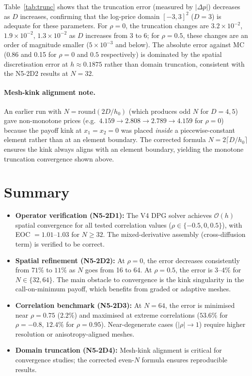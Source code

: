 \documentclass[11pt,a4paper]{article}
\begin{document}
Table~\ref{tab:trunc} shows that the truncation error (measured by $|\Delta p|$)
decreases as $D$ increases, confirming that the log-price domain $[-3,3]^2$
($D=3$) is adequate for these parameters.  For $\rho=0$, the truncation
changes are $3.2\times10^{-2}$, $1.9\times10^{-2}$, $1.3\times10^{-2}$
as $D$ increases from 3 to 6; for $\rho=0.5$, these changes are an order
of magnitude smaller ($5\times10^{-3}$ and below).  The absolute error
against MC (0.86 and 0.15 for $\rho=0$ and $0.5$ respectively) is dominated
by the spatial discretisation error at $h\approx0.1875$ rather than domain
truncation, consistent with the N5-2D2 results at $N=32$.

\paragraph{Mesh-kink alignment note.}
An earlier run with $N=\mathrm{round}(2D/h_0)$ (which produces odd $N$ for
$D=4,5$) gave non-monotone prices (e.g.\ $4.159\to2.808\to2.789\to4.159$ for
$\rho=0$) because the payoff kink at $x_1=x_2=0$ was placed \emph{inside} a
piecewise-constant element rather than at an element boundary.  The corrected
formula $N=2\lceil D/h_0\rceil$ ensures the kink always aligns with an element
boundary, yielding the monotone truncation convergence shown above.

\section{Summary}
\label{sec:summary}

\begin{itemize}
  \item \textbf{Operator verification (N5-2D1):} The V4 DPG solver achieves
    $\mathcal{O}(h)$ spatial convergence for all tested correlation values
    ($\rho\in\{-0.5,0,0.5\}$), with EOC $=1.01$--$1.03$ for $N\geq 32$.
    The mixed-derivative assembly (cross-diffusion term) is verified to be
    correct.

  \item \textbf{Spatial refinement (N5-2D2):} At $\rho=0$, the error
    decreases consistently from $71\%$ to $11\%$ as $N$ goes from 16 to 64.
    At $\rho=0.5$, the error is $3$--$4\%$ for $N\in\{32,64\}$.  The main
    obstacle to convergence is the kink singularity in the call-on-minimum
    payoff, which benefits from graded or adaptive meshes.

  \item \textbf{Correlation benchmark (N5-2D3):} At $N=64$, the error is
    minimised near $\rho=0.75$ ($2.2\%$) and maximised at extreme correlations
    ($53.6\%$ for $\rho=-0.8$, $12.4\%$ for $\rho=0.95$).  Near-degenerate
    cases ($|\rho|\to 1$) require higher resolution or anisotropy-aligned
    meshes.

  \item \textbf{Domain truncation (N5-2D4):} Mesh-kink alignment is critical
    for convergence studies; the corrected even-$N$ formula ensures
    reproducible results.
\end{itemize}
\end{document}
